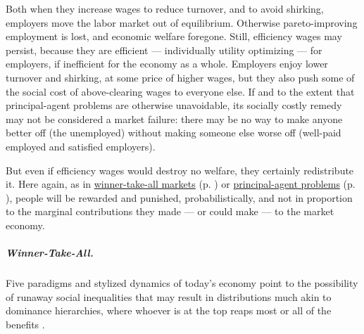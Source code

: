 Both when they increase wages to reduce turnover, and to avoid shirking, employers move the labor market out of equilibrium. Otherwise pareto-improving employment is lost, and economic welfare foregone. Still, efficiency wages may persist, because they are efficient --- individually utility optimizing --- for employers, if inefficient for the economy as a whole. Employers enjoy lower turnover and shirking, at some price of higher wages, but they also push some of the social cost of above-clearing wages to everyone else. If and to the extent that principal-agent problems are otherwise unavoidable, its socially costly remedy may not be considered a market failure: there may be no way to make anyone better off (the unemployed) without making someone else worse off (well-paid employed and satisfied employers).

But even if efficiency wages would destroy no welfare, they certainly redistribute it. Here again, as in \hyperref[sec:winner-take-all]{winner-take-all markets} (p. \pageref{sec:winner-take-all}) or \hyperref[sec:principal-agentproblem]{principal-agent problems} (p. \pageref{sec:principal-agentproblem}), people will be rewarded and punished, probabilistically, and not in proportion to the marginal contributions they made --- or could make --- to the market economy.

\subparagraph[Winner-Take-All]{Winner-Take-All.}  \label{sec:winner-take-all} Five paradigms and stylized dynamics of today's economy point to the possibility of runaway social inequalities that may result in distributions much akin to dominance hierarchies, where whoever is at the top reaps most or all of the benefits \citep{Frank1996}.


